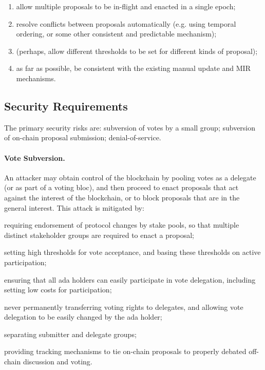 \begin{enumerate}[resume]
\item
  allow multiple proposals to be in-flight and enacted in a single epoch;
\item
  resolve conflicts between proposals automatically (e.g. using temporal ordering, or some other consistent and predictable mechanism);
\item
  (perhaps, allow different thresholds to be set for different kinds of proposal);
\item
  as far as possible, be consistent with the existing manual update and MIR mechanisms.
\end{enumerate}

\pagebreak
\subsection{Security Requirements}
\label{sect:security}

The primary security risks are: subversion of votes by a small group; subversion of on-chain proposal submission; denial-of-service.

\paragraph{Vote Subversion.}
An attacker may obtain control of the blockchain by pooling votes as a delegate (or as part of a voting bloc), and then proceed to enact proposals that act against the interest of the blockchain, or to block
proposals that are in the general interest.   This attack is mitigated by:
  \begin{inparaenum}
  \item
    requiring endorsement of protocol changes by stake pools, so that multiple distinct stakeholder groups are required to enact a proposal;
  \item
    setting high thresholds for vote acceptance, and basing these thresholds on active participation;
  \item
    ensuring that all ada holders can easily participate in vote delegation, including setting low costs for participation;
  \item
    never permanently transferring voting rights to delegates, and allowing vote delegation to be easily changed by the ada holder;
  \item
    separating submitter and delegate groups;
  \item
    providing tracking mechanisms to tie on-chain proposals to properly debated off-chain discussion and voting.
  \end{inparaenum}

